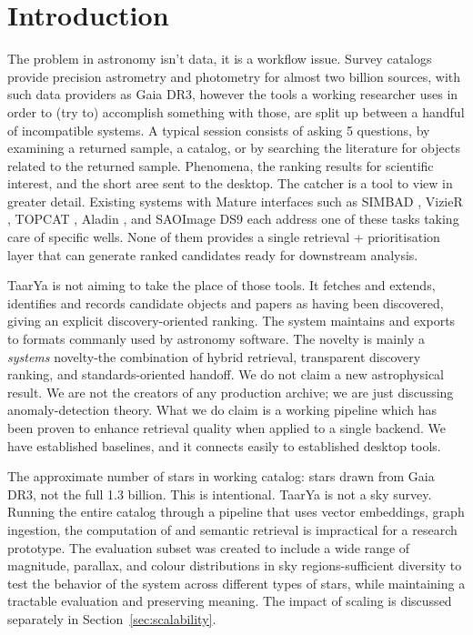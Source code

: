\documentclass[12pt]{elsarticle}
\begin{document}
\linenumbers

\section{Introduction}
\label{sec:intro}

The problem in astronomy isn't data, it is a workflow issue. Survey catalogs provide precision astrometry and photometry for almost two billion sources, with such data providers as Gaia DR3\citep{Vallenari2023, Lindegren2021}, however the tools a working researcher uses in order to (try to) accomplish something with those, are split up between a handful of incompatible systems. A typical session consists of asking 5 questions, by examining a returned sample, a catalog, or by searching the literature for objects related to the returned sample. Phenomena, the ranking results for scientific interest, and the short aree sent to the desktop. The catcher is a tool to view in greater detail. Existing systems with Mature interfaces such as SIMBAD \citep{Wenger2000}, VizieR \citep{Ochsenbein2000}, TOPCAT \citep{Taylor2005}, Aladin \citep{Bonnarel2000}, and SAOImage DS9 \citep{Joye2003} each address one of these tasks taking care of specific wells. None of them provides a single retrieval + prioritisation layer that can generate ranked candidates ready for downstream analysis.

\textsf{TaarYa} is not aiming to take the place of those tools. It fetches and extends, identifies and records candidate objects and papers as having been discovered, giving an explicit discovery-oriented ranking. The system maintains and exports to formats commanly used by astronomy software. The novelty is mainly a \emph{systems} novelty-the combination of hybrid retrieval, transparent discovery ranking, and standards-oriented handoff. We do not claim a new astrophysical result. We are not the creators of any production archive; we are just discussing anomaly-detection theory. What we do claim is a working pipeline which has been proven to enhance retrieval quality when applied to a single backend. We have established baselines, and it connects easily to established desktop tools.

The approximate number of stars in working catalog: \nStarsReal{} stars drawn from Gaia DR3, not the full 1.3 billion. This is intentional. \textsf{TaarYa} is not a sky survey. Running the entire catalog through a pipeline that uses vector embeddings, graph ingestion, the computation of and semantic retrieval is impractical for a research prototype. The evaluation subset was created to include a wide range of magnitude, parallax, and colour distributions in \nClusterNodes{} sky regions-sufficient diversity to test the behavior of the system across different types of stars, while maintaining a tractable evaluation and preserving meaning. The impact of scaling is discussed separately in Section~\ref{sec:scalability}.
\end{document}
